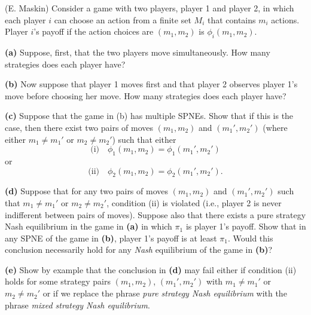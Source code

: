 
(E. Maskin) Consider a game with two players, player 1 and player 2, in
which each player $i$ can choose an action from a finite set $M_i$ that contains $m_i$ actions.
Player $i$'s payoff if the action choices are $(m_1, m_2)$ is $\phi_i(m_1, m_2)$.

\textbf{(a)} Suppose, first, that the two players move simultaneously. How many strategies does each
player have?

\textbf{(b)} Now suppose that player 1 moves first and that player 2 observes player 1's move before
choosing her move. How many strategies does each player have?

\textbf{(c)} Suppose that the game in (b) has multiple SPNEs. Show that if this is the case, then
there exist two pairs of moves $(m_1, m_2)$ and $(m_1', m_2')$ (where either $m_1 \neq m_1'$ or
$m_2 \neq m_2'$) such that either
\[ \text{(i)}\quad \phi_1(m_1, m_2) = \phi_1(m_1', m_2') \]
or
\[ \text{(ii)}\quad \phi_2(m_1, m_2) = \phi_2(m_1', m_2'). \]

\textbf{(d)} Suppose that for any two pairs of moves $(m_1, m_2)$ and $(m_1', m_2')$ such that
$m_1 \neq m_1'$ or $m_2 \neq m_2'$, condition (ii) is violated (i.e., player 2 is never indifferent
between pairs of moves). Suppose also that there exists a pure strategy Nash equilibrium in the
game in \textbf{(a)} in which $\pi_1$ is player 1's payoff. Show that in any SPNE of the game in
\textbf{(b)}, player 1's payoff is at least $\pi_1$. Would this conclusion necessarily hold for any
\emph{Nash} equilibrium of the game in \textbf{(b)}?

\textbf{(e)} Show by example that the conclusion in \textbf{(d)} may fail either if condition (ii)
holds for some strategy pairs $(m_1, m_2)$, $(m_1', m_2')$ with $m_1 \neq m_1'$ or
$m_2 \neq m_2'$ or if we replace the phrase \emph{pure strategy Nash equilibrium} with the phrase
\emph{mixed strategy Nash equilibrium}.
\resolespaco

